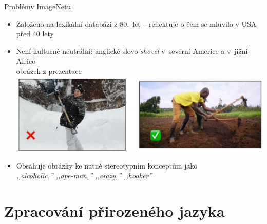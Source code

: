 \documentclass[handout,aspectratio=169,dvipsnames]{beamer}
\begin{document}
\begin{frame}{Problémy ImageNetu}

    \begin{itemize}[<+->]

        \item Založeno na lexikální databázi z 80.\ let -- reflektuje o čem se
            mluvilo v USA před 40 lety

        \item Není kulturně neutrální: anglické slovo \emph{shovel} v~severní
            Americe a v~jižní Africe \\ {\tiny obrázek z prezentace
            \citet{liu-etal-2021-visually}} \\
            \includegraphics[scale=.35]{img/shovel.png}

        \item Obsahuje obrázky ke nutně stereotypním konceptům jako {\tiny \citep[str.\ 109]{crawford2021atlas}} \\
            \quad\it ,,alcoholic,'' ,,ape-­man,'' ,,crazy,'' ,,hooker''
    \end{itemize}

\end{frame}




\section[Zpracování jazyka]{Zpracování přirozeného jazyka}

\end{document}
